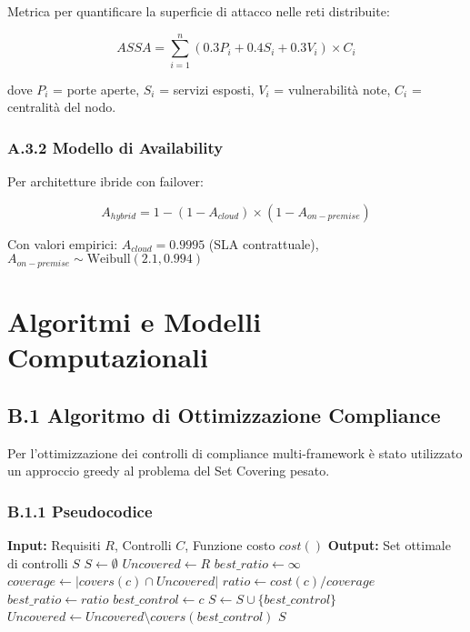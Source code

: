 Metrica per quantificare la superficie di attacco nelle reti distribuite:

\begin{equation}
ASSA = \sum_{i=1}^{n} \left(0.3 P_i + 0.4 S_i + 0.3 V_i\right) \times C_i
\end{equation}

dove $P_i$ = porte aperte, $S_i$ = servizi esposti, $V_i$ = vulnerabilità note, $C_i$ = centralità del nodo.

\subsection{A.3.2 Modello di Availability}

Per architetture ibride con failover:

\begin{equation}
A_{hybrid} = 1 - (1 - A_{cloud}) \times (1 - A_{on-premise})
\end{equation}

Con valori empirici: $A_{cloud} = 0.9995$ (SLA contrattuale), $A_{on-premise} \sim \text{Weibull}(2.1, 0.994)$

\chapter{Algoritmi e Modelli Computazionali}

\section{B.1 Algoritmo di Ottimizzazione Compliance}

Per l'ottimizzazione dei controlli di compliance multi-framework è stato utilizzato un approccio greedy al problema del Set Covering pesato.

\subsection{B.1.1 Pseudocodice}

\begin{algorithmic}[1]
\State \textbf{Input:} Requisiti $R$, Controlli $C$, Funzione costo $cost()$
\State \textbf{Output:} Set ottimale di controlli $S$
\State
\State $S \leftarrow \emptyset$
\State $Uncovered \leftarrow R$
    \State $best\_ratio \leftarrow \infty$
        \State $coverage \leftarrow |covers(c) \cap Uncovered|$
        \State $ratio \leftarrow cost(c) / coverage$
            \State $best\_ratio \leftarrow ratio$
            \State $best\_control \leftarrow c$
        \EndIf
    \EndFor
    \State $S \leftarrow S \cup \{best\_control\}$
    \State $Uncovered \leftarrow Uncovered \setminus covers(best\_control)$
\EndWhile
\State \Return $S$
\end{algorithmic}

